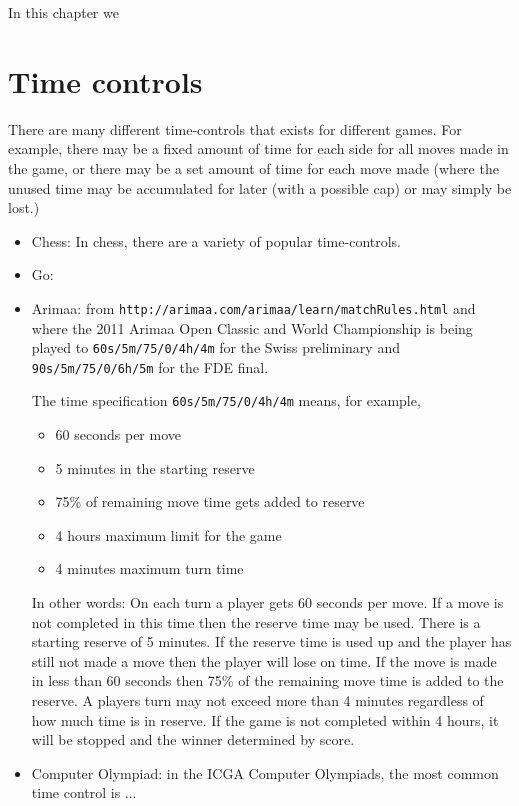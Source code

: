 \documentclass[10pt,dvipdfmx]{report}
\begin{document}
In this chapter we 

\section{Time controls}
There are many different time-controls that exists for different games.
For example, there may be a fixed amount of time for each side for all moves
made in the game, or there may be a set amount of time for each move made (where
the unused time may be accumulated for later (with a possible cap) or may simply
be lost.)

\begin{itemize}
\item Chess: In chess, there are a variety of popular time-controls.
\item Go:
\item Arimaa: from {\tt http://arimaa.com/arimaa/learn/matchRules.html}
and where the 2011 Arimaa Open Classic and World Championship
is being played to {\tt 60s/5m/75/0/4h/4m} for the Swiss preliminary and
{\tt 90s/5m/75/0/6h/5m} for the FDE final.

The time specification {\tt 60s/5m/75/0/4h/4m} means, for example,
  \begin{itemize}
  \item 60 seconds per move
  \item 5 minutes in the starting reserve
  \item 75\% of remaining move time gets added to reserve
  \item 4 hours maximum limit for the game
  \item 4 minutes maximum turn time 
  \end{itemize}
In other words:
On each turn a player gets 60 seconds per move.
If a move is not completed in this time then the reserve time may be used.
There is a starting reserve of 5 minutes.
If the reserve time is used up and the player has still not made a move then the player will lose on time.
If the move is made in less than 60 seconds then 75\% of the remaining move time is added to the reserve.
A players turn may not exceed more than 4 minutes regardless of how much time is in reserve.
If the game is not completed within 4 hours, it will be stopped and the winner determined by score.
\item Computer Olympiad: in the ICGA Computer Olympiads, the most common time control is ...
\end{itemize}
\end{document}
